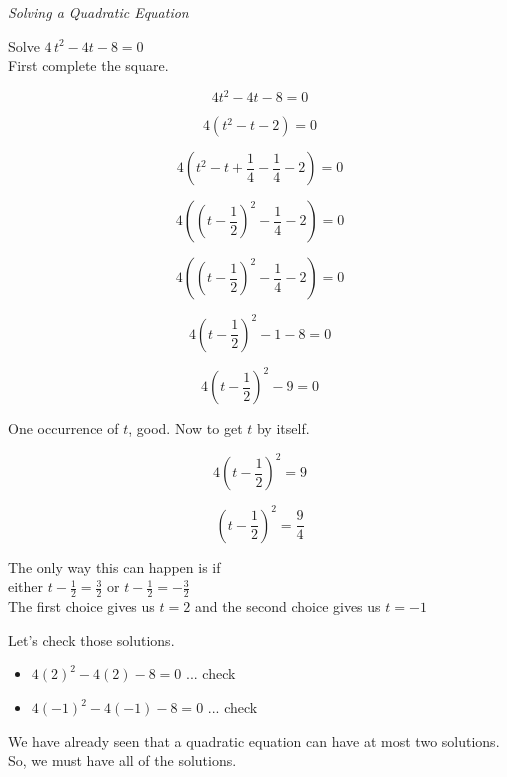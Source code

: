 \documentclass{ximera}
\begin{document}
\begin{example} \textit{Solving a Quadratic Equation}

Solve $4 \, t^2 - 4 t - 8 = 0$ \\


First complete the square.



\[ 4 t^2 -  4 t - 8 = 0 \]

\[ 4 (t^2 - t - 2) = 0 \]

\[ 4 (t^2 - t + \frac{1}{4} - \frac{1}{4} - 2) = 0 \]


\[ 4 \left(\left(t - \frac{1}{2}\right)^2 - \frac{1}{4} - 2\right) = 0 \]


\[ 4 \left(\left(t - \frac{1}{2}\right)^2 - \frac{1}{4} - 2\right) = 0 \]

\[ 4 \left(t - \frac{1}{2}\right)^2 - 1 - 8 = 0 \]

\[ 4 \left(t - \frac{1}{2}\right)^2 - 9 = 0 \]


One occurrence of $t$, good. Now to get $t$ by itself.


\[ 4 \left(t - \frac{1}{2}\right)^2 = 9  \]

\[  \left(t - \frac{1}{2}\right)^2 = \frac{9}{4}  \]

The only way this can happen is if \\



either   $t - \frac{1}{2} = \frac{3}{2}$  or  $t - \frac{1}{2} = -\frac{3}{2}$ \\

The first choice gives us $t = 2$ and the second choice gives us $t = -1$



Let's check those solutions.

\begin{itemize}
\item $4 (2)^2 - 4 (2) - 8 = 0$ ... check
\item $4 (-1)^2 - 4 (-1) - 8 = 0$ ... check
\end{itemize}



We have already seen that a quadratic equation can have at most two solutions.  So, we must have all of the solutions.



\end{example}




\vspace{20pt}
\end{document}

